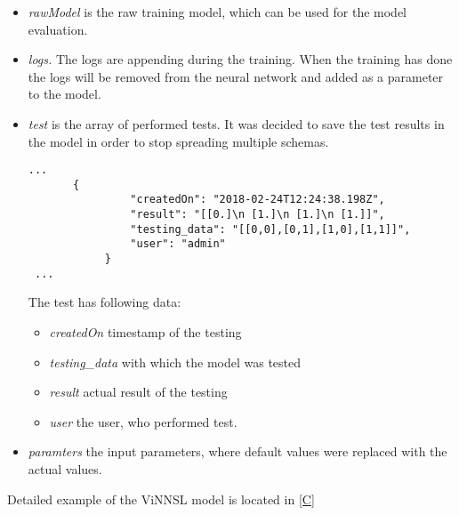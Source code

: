 \begin{itemize}
\item \emph{rawModel} is the raw training model, which can be used for the model evaluation. 
\item \emph{logs.} The logs are appending during the training. When the training has done the logs will be removed from the neural network and added as a parameter to the model.
\item \emph{test} is the array of performed tests. It was decided to save the test results in the model in order to stop spreading multiple schemas. 
 \begin{lstlisting}
...
       {
                "createdOn": "2018-02-24T12:24:38.198Z",
                "result": "[[0.]\n [1.]\n [1.]\n [1.]]",
                "testing_data": "[[0,0],[0,1],[1,0],[1,1]]",
                "user": "admin"
            }
 ...
\end{lstlisting}
The test has following data:
\begin{itemize}
\item \emph{createdOn} timestamp of the testing
\item \emph{testing\_data} with which the model was tested
\item \emph{result} actual result of the testing
\item \emph{user} the user, who performed test.
\end{itemize}
\item \emph{paramters} the input parameters, where default values were replaced with the actual values. 
\end{itemize}

Detailed example of the ViNNSL model is located in \autoref{C}

